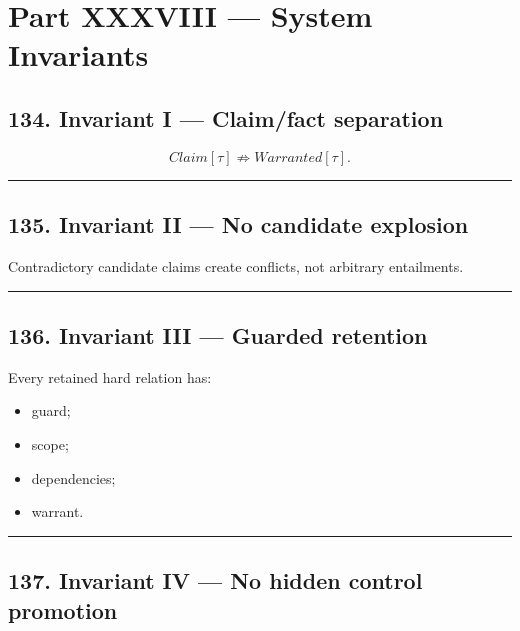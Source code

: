 \documentclass[
]{article}
\providecommand{\tightlist}{%
  \setlength{\itemsep}{0pt}\setlength{\parskip}{0pt}}
\begin{document}
\section{Part XXXVIII --- System
Invariants}\label{part-xxxviii-system-invariants}

\subsection{134. Invariant I --- Claim/fact
separation}\label{invariant-i-claimfact-separation}

\[
\boxed{
Claim[\tau]\not\Rightarrow Warranted[\tau].
}
\]

\begin{center}\rule{0.5\linewidth}{0.5pt}\end{center}

\subsection{135. Invariant II --- No candidate
explosion}\label{invariant-ii-no-candidate-explosion}

Contradictory candidate claims create conflicts, not arbitrary
entailments.

\begin{center}\rule{0.5\linewidth}{0.5pt}\end{center}

\subsection{136. Invariant III --- Guarded
retention}\label{invariant-iii-guarded-retention}

Every retained hard relation has:

\begin{itemize}
\tightlist
\item
  guard;
\item
  scope;
\item
  dependencies;
\item
  warrant.
\end{itemize}

\begin{center}\rule{0.5\linewidth}{0.5pt}\end{center}

\subsection{137. Invariant IV --- No hidden control
promotion}\label{invariant-iv-no-hidden-control-promotion}
\end{document}

